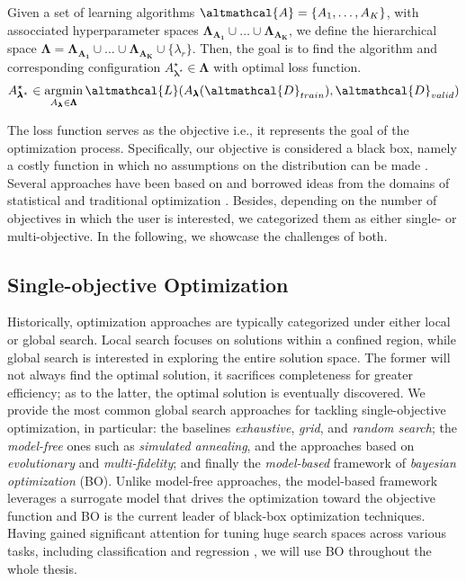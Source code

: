 \begin{definition}
    Given a set of learning algorithms $\altmathcal{A} = \{A_1, \dots, A_K\}$, with assocciated hyperparameter spaces  $\pmb{\Lambda_{A_1}} \cup \dots \cup \pmb{\Lambda_{A_K}}$, we define the hierarchical space $\pmb{\Lambda} = \pmb{\Lambda_{A_1}} \cup \dots \cup \pmb{\Lambda_{A_K}} \cup \{\lambda_r\}$. Then, the goal is to find the algorithm and corresponding configuration $A^{\star}_{\pmb{\lambda}^{\star}} \in \pmb{\Lambda}$ with optimal loss function.
    \begin{equation*}
        A^{\star}_{\pmb{\lambda}^{\star}} \in \argmin_{A_{\pmb{\lambda}} \in \pmb{\Lambda}} \altmathcal{L}(A_{\pmb{\lambda}}(\altmathcal{D}_{train}), \altmathcal{D}_{valid})
    \end{equation*}
\end{definition}

The loss function serves as the objective i.e., it represents the goal of the optimization process.
Specifically, our objective is considered a black box, namely a costly function in which no assumptions on the distribution can be made \cite{kushner1964new, zhilinskas1975single, mockus1998application, jones1998efficient}.
Several approaches have been based on and borrowed ideas from the domains of statistical and traditional optimization \cite{levesque-ieee17a}.
Besides, depending on the number of objectives in which the user is interested, we categorized them as either single- or multi-objective.
In the following, we showcase the challenges of both.

\subsection{Single-objective Optimization}

Historically, optimization approaches are typically categorized under either local or global search.
Local search focuses on solutions within a confined region, while global search is interested in exploring the entire solution space.
The former will not always find the optimal solution, it sacrifices completeness for greater efficiency; as to the latter, the optimal solution is eventually discovered.
We provide the most common global search approaches for tackling single-objective optimization, in particular: the baselines \textit{exhaustive}, \textit{grid}, and \textit{random search};  the \textit{model-free} ones such as \textit{simulated annealing}, and the approaches based on \textit{evolutionary} and \textit{multi-fidelity}; and finally the \textit{model-based} framework of \textit{bayesian optimization} (BO).
Unlike model-free approaches, the model-based framework leverages a surrogate model that drives the optimization toward the objective function and BO is the current leader of black-box optimization techniques.
Having gained significant attention for tuning huge search spaces across various tasks, including classification and regression \cite{snoek2012practical, snoek2015scalable}, we will use BO throughout the whole thesis.

